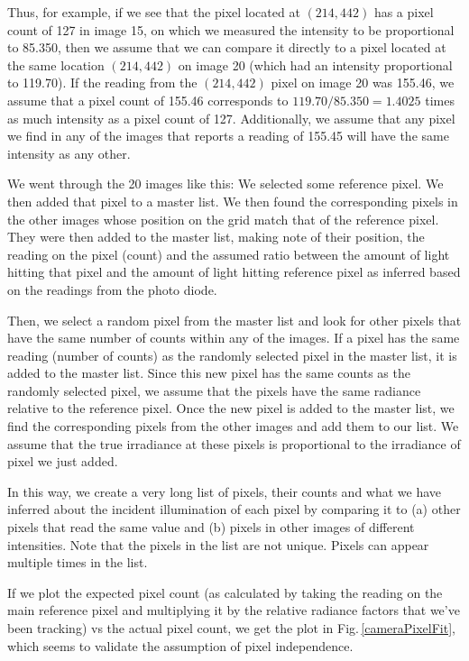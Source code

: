 Thus, for example, if we see that the pixel located at $(214,442)$ has a pixel count of 127 in image 15, on which we measured the intensity to be proportional to 85.350, then we assume that we can compare it directly to a pixel located at the same location $(214,442)$ on image 20 (which had an intensity proportional to 119.70). If the reading from the $(214,442)$ pixel on image 20 was 155.46, we assume that a pixel count of 155.46 corresponds to $119.70/85.350=1.4025$ times as much intensity as a pixel count of 127. Additionally, we assume that any pixel we find in any of the images that reports a reading of 155.45 will have the same intensity as any other. 

We went through the 20 images like this: We selected some reference pixel. We then added that pixel to a master list. We then found the corresponding pixels in the other images whose position on the grid match that of the reference pixel. They were then added to the master list, making note of their position, the reading on the pixel (count) and the assumed ratio between the amount of light hitting that pixel and the amount of light hitting reference pixel as inferred based on the readings from the photo diode.

Then, we select a random pixel from the master list and look for other pixels that have the same number of counts within any of the images. If a pixel has the same reading (number of counts) as the randomly selected pixel in the master list, it is added to the master list. Since this new pixel has the same counts as the randomly selected pixel, we assume that the pixels have the same radiance relative to the reference pixel. Once the new pixel is added to the master list, we find the corresponding pixels from the other images and add them to our list. We assume that the true irradiance at these pixels is proportional to the irradiance of pixel we just added. 

In this way, we create a very long list of pixels, their counts and what we have inferred about the incident illumination of each pixel by comparing it to (a) other pixels that read the same value and (b) pixels in other images of different intensities. Note that the pixels in the list are not unique. Pixels can appear multiple times in the list.

If we plot the expected pixel count (as calculated by taking the reading on the main reference pixel and multiplying it by the relative radiance factors that we've been tracking) vs the actual pixel count, we get the plot in Fig.\,\ref{cameraPixelFit}, which seems to validate the assumption of pixel independence.

